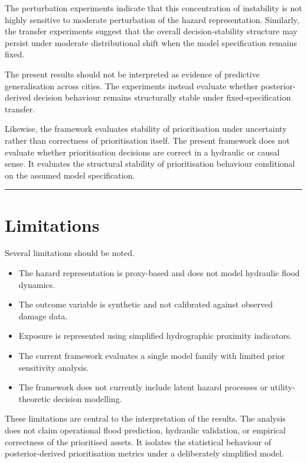 \documentclass[
]{article}
\providecommand{\tightlist}{%
  \setlength{\itemsep}{0pt}\setlength{\parskip}{0pt}}
\begin{document}
The perturbation experiments indicate that this concentration of
instability is not highly sensitive to moderate perturbation of the
hazard representation. Similarly, the transfer experiments suggest that
the overall decision-stability structure may persist under moderate
distributional shift when the model specification remains fixed.

The present results should not be interpreted as evidence of predictive
generalisation across cities. The experiments instead evaluate whether
posterior-derived decision behaviour remains structurally stable under
fixed-specification transfer.

Likewise, the framework evaluates stability of prioritisation under
uncertainty rather than correctness of prioritisation itself. The
present framework does not evaluate whether prioritisation decisions are
correct in a hydraulic or causal sense. It evaluates the structural
stability of prioritisation behaviour conditional on the assumed model
specification.

\begin{center}\rule{0.5\linewidth}{0.5pt}\end{center}

\section{Limitations}\label{limitations}

Several limitations should be noted.

\begin{itemize}
\tightlist
\item
  The hazard representation is proxy-based and does not model hydraulic
  flood dynamics.
\item
  The outcome variable is synthetic and not calibrated against observed
  damage data.
\item
  Exposure is represented using simplified hydrographic proximity
  indicators.
\item
  The current framework evaluates a single model family with limited
  prior sensitivity analysis.
\item
  The framework does not currently include latent hazard processes or
  utility-theoretic decision modelling.
\end{itemize}

These limitations are central to the interpretation of the results. The
analysis does not claim operational flood prediction, hydraulic
validation, or empirical correctness of the prioritised assets. It
isolates the statistical behaviour of posterior-derived prioritisation
metrics under a deliberately simplified model.
\end{document}
